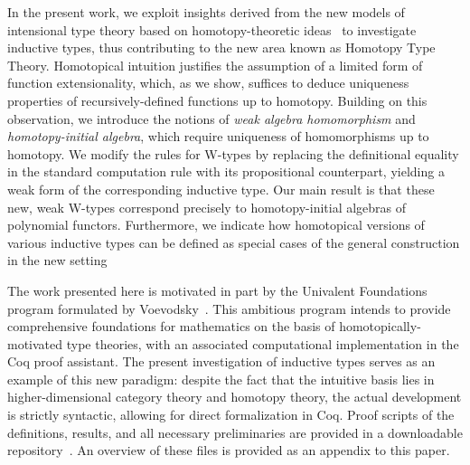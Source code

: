  
In the present work, we exploit insights derived from the new models of intensional type theory based on 
homotopy-theoretic ideas~\cite{AwodeyS:homtmi,VoevodskyV:notts,vandenBergB:topsmi} to 
investigate inductive types, thus contributing to the new area known as Homotopy Type Theory.
Homotopical intuition justifies the assumption of a limited form of function extensionality, which, 
as we show, suffices to deduce uniqueness properties of recursively-defined functions up to  
homotopy.
Building on this observation, we introduce the notions of \emph{weak algebra homomorphism} and \emph
{homotopy-initial algebra}, which require uniqueness of homomorphisms up to homotopy. We modify the rules for W-types by replacing the definitional equality in the standard
computation rule with its propositional counterpart, yielding a weak form of the corresponding inductive type. 
Our main result is that these new, weak W-types correspond precisely to homotopy-initial algebras of 
polynomial functors.   Furthermore, we indicate how homotopical versions of various inductive types can be defined as special cases of the general construction in the new setting

The work presented here is motivated in part by the Univalent Foundations program formulated by 
Voevodsky~\cite{VoevodskyV:unifp}.  This ambitious program intends to provide comprehensive foundations for mathematics on the basis of homotopically-motivated type theories, with an associated computational implementation in the Coq proof assistant.  The present investigation of inductive types   serves as an example of this new paradigm: despite the fact that the intuitive basis lies in higher-dimensional category theory and homotopy theory, the actual development is strictly syntactic, allowing for direct formalization in Coq.  Proof scripts of the definitions, results, and all necessary preliminaries are provided in a downloadable repository~\cite{AwodeyS:indtht}. An overview of these files is provided as an appendix to this paper.

